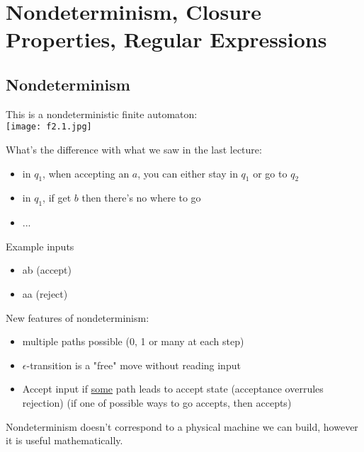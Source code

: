 \chapter{Nondeterminism, Closure Properties, Regular Expressions}

\section{Nondeterminism}

\begin{eg}\label{eg: NFA}
    This is a nondeterministic finite automaton:\\
    \texttt{[image: f2.1.jpg]}
    
    What's the difference with what we saw in the last lecture:
    \begin{itemize}
        \item in \(q_1\), when accepting an \(a\), you can either stay in \(q_1\) or go to \(q_2\)
        \item in \(q_1\), if get \(b\) then there's no where to go 
        \item ...
    \end{itemize}

    Example inputs
    \begin{itemize}
        \item ab (accept)
        \item aa (reject)
    \end{itemize}

\end{eg}

New features of nondeterminism:
\begin{itemize}
    \item multiple paths possible (0, 1 or many at each step)
    \item \(\epsilon\)-transition is a "free" move without reading input
    \item Accept input if \underline{some} path leads to accept state (acceptance overrules rejection) (if one of possible ways to go accepts, then accepts)
\end{itemize}

Nondeterminism doesn't correspond to a physical machine we can build, however it is useful mathematically.

